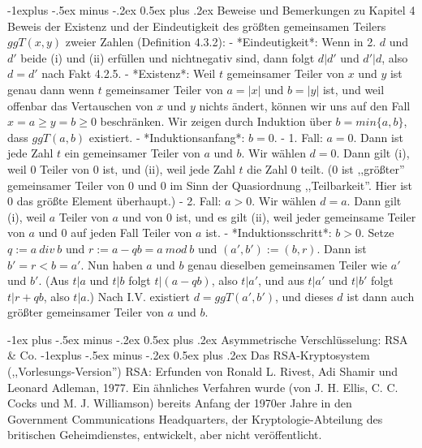 \documentclass[a4paper]{article}
\makeatletter
\renewcommand{\section}{\@startsection{section}{1}{0mm}%
 {-1ex plus -.5ex minus -.2ex}%
 {0.5ex plus .2ex}%
 {\normalfont\large\bfseries}}
\renewcommand{\subsection}{\@startsection{subsection}{2}{0mm}%
 {-1explus -.5ex minus -.2ex}%
 {0.5ex plus .2ex}%
 {\normalfont\normalsize\bfseries}}
\makeatother
\begin{document}
\begin{multicols}{3}
        \subsection{Beweise und Bemerkungen zu Kapitel 4}
        Beweis der Existenz und der Eindeutigkeit des größten gemeinsamen Teilers $ggT(x,y)$ zweier Zahlen (Definition 4.3.2):
        - *Eindeutigkeit*: Wenn in 2. $d$ und $d'$ beide (i) und (ii) erfüllen und nichtnegativ sind, dann folgt $d|d'$ und $d'|d$, also $d=d'$ nach Fakt 4.2.5.
        - *Existenz*: Weil $t$ gemeinsamer Teiler von $x$ und $y$ ist genau dann wenn $t$ gemeinsamer Teiler von $a=|x|$ und $b=|y|$ ist, und weil offenbar das Vertauschen von $x$ und $y$ nichts ändert, können wir uns auf den Fall $x=a\geq y=b\geq 0$ beschränken. Wir zeigen durch Induktion über $b=min\{a,b\}$, dass $ggT(a,b)$ existiert.
        - *Induktionsanfang*: $b=0$.
        - 1. Fall: $a= 0$. Dann ist jede Zahl $t$ ein gemeinsamer Teiler von $a$ und $b$. Wir wählen $d=0$. Dann gilt (i), weil $0$ Teiler von $0$ ist, und (ii), weil jede Zahl $t$ die Zahl $0$ teilt. ($0$ ist ,,größter'' gemeinsamer Teiler von 0 und 0 im Sinn der Quasiordnung ,,Teilbarkeit''. Hier ist 0 das größte Element überhaupt.)
        - 2. Fall: $a >0$. Wir wählen $d=a$. Dann gilt (i), weil $a$ Teiler von $a$ und von 0 ist, und es gilt (ii), weil jeder gemeinsame Teiler von $a$ und 0 auf jeden Fall Teiler von $a$ ist.
        - *Induktionsschritt*: $b>0$. Setze $q:=a\ div\ b$ und $r:=a-qb=a\ mod\ b$ und $(a',b'):=(b,r)$. Dann ist $b'=r < b=a'$. Nun haben $a$ und $b$ genau dieselben gemeinsamen Teiler wie $a'$ und $b'$. (Aus $t|a$ und $t|b$ folgt $t|(a-qb)$, also $t|a'$, und aus $t|a'$ und $t|b'$ folgt $t|r+qb$, also $t|a$.) Nach I.V. existiert $d= ggT(a',b')$, und dieses $d$ ist dann auch größter gemeinsamer Teiler von $a$ und $b$.


        \section{Asymmetrische Verschlüsselung: RSA \& Co.}
        \subsection{Das RSA-Kryptosystem (,,Vorlesungs-Version'')}
        RSA: Erfunden von Ronald L. Rivest, Adi Shamir und Leonard Adleman, 1977. Ein ähnliches Verfahren wurde (von J. H. Ellis, C. C. Cocks und M. J. Williamson) bereits Anfang der 1970er Jahre in den Government Communications Headquarters, der Kryptologie-Abteilung des britischen Geheimdienstes, entwickelt, aber nicht veröffentlicht.


\end{multicols}
\end{document}
